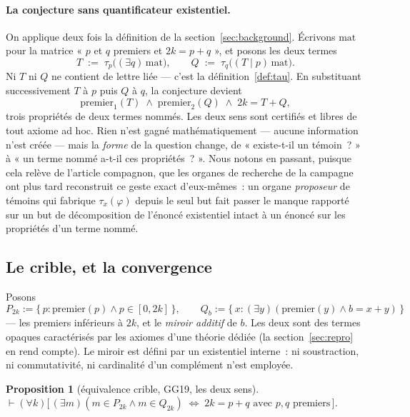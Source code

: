 \documentclass[11pt]{article}
\newtheorem{proposition}{Proposition}
\theoremstyle{remark}\newtheorem{remarque}{Remarque}
\begin{document}
\paragraph{La conjecture sans quantificateur existentiel.} On applique deux fois la
définition de la section~\ref{sec:background}. Écrivons $\mathrm{mat}$ pour la matrice
« $p$ et $q$ premiers et $2k = p+q$ », et posons les deux termes
\[
T \;:=\; \tau_p\bigl((\exists q)\,\mathrm{mat}\bigr),
\qquad
Q \;:=\; \tau_q\bigl((T \mid p)\,\mathrm{mat}\bigr) .
\]
Ni $T$ ni $Q$ ne contient de lettre liée --- c'est la définition~\ref{def:tau}. En
substituant successivement $T$ à $p$ puis $Q$ à $q$, la conjecture devient
\[
\mathrm{premier}_1(T) \;\wedge\; \mathrm{premier}_2(Q) \;\wedge\; 2k = T + Q ,
\]
trois propriétés de deux termes nommés. Les deux sens sont certifiés et libres de tout
axiome ad hoc. Rien n'est gagné mathématiquement --- aucune information n'est créée ---
mais la \emph{forme} de la question change, de « existe-t-il un témoin~? » à « un terme
nommé a-t-il ces propriétés~? ». Nous notons en passant, puisque cela relève de l'article
compagnon, que les organes de recherche de la campagne ont plus tard reconstruit ce geste
exact d'eux-mêmes~: un organe \emph{proposeur} de témoins qui fabrique $\tau_x(\varphi)$
depuis le seul but fait passer le manque rapporté sur un but de décomposition de
l'énoncé existentiel intact à un énoncé sur les propriétés d'un terme nommé.

\subsection{Le crible, et la convergence}

Posons
\[
P_{2k} := \{\, p : \mathrm{premier}(p) \wedge p \in [0,2k] \,\},
\qquad
Q_{b} := \{\, x : (\exists y)(\mathrm{premier}(y) \wedge b = x + y) \,\}
\]
--- les premiers inférieurs à $2k$, et le \emph{miroir additif} de $b$. Les deux sont des
termes opaques caractérisés par les axiomes d'une théorie dédiée (la
section~\ref{sec:repro} en rend compte). Le miroir est défini par un existentiel
interne~: ni soustraction, ni commutativité, ni cardinalité d'un complément n'est
employée.

\begin{proposition}[équivalence crible, GG19, les deux sens]
$\vdash (\forall k)\bigl[\, (\exists m)(m \in P_{2k} \wedge m \in Q_{2k})
\;\Longleftrightarrow\; 2k = p+q \text{ avec } p,q \text{ premiers} \,\bigr]$.
\end{proposition}
\end{document}
